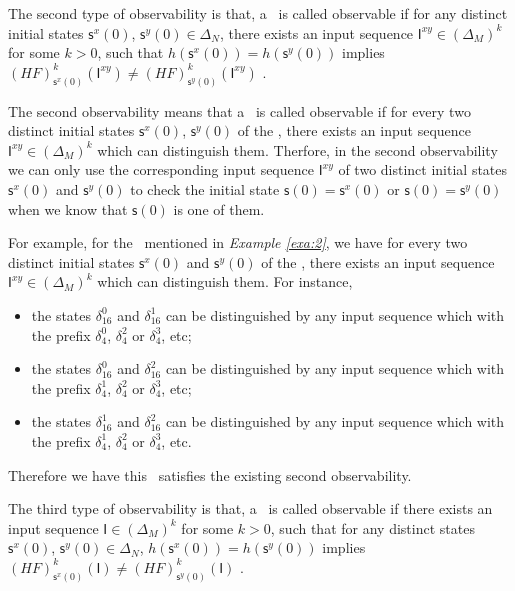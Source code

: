 \begin{definition}
	The second type of observability is that, a \BCN\ is called observable if for any distinct initial states $\mathsf{s}^{x}(0)$, $\mathsf{s}^{y}(0) \in \Delta_N$, there exists an input sequence $\mathsf{I}^{xy}\in(\Delta_M)^k$ for some $k>0$, such that $h(\mathsf{s}^{x}(0))=h(\mathsf{s}^{y}(0))$ implies $(HF)^k_{\mathsf{s}^{x}(0)}(\mathsf{I}^{xy})\neq (HF)^k_{\mathsf{s}^{y}(0)}(\mathsf{I}^{xy})$ \cite{Zhao2010Input}.
\end{definition}

The second observability means that a \BCN\ is called observable if for every two distinct initial states $\mathsf{s}^{x}(0)$, $\mathsf{s}^{y}(0)$ of the \BCN, there exists an input sequence $\mathsf{I}^{xy} \in(\Delta_M)^k$ which can distinguish them. Therfore, in the second observability we can only use the corresponding input sequence $\mathsf{I}^{xy}$ of two distinct initial states $\mathsf{s}^{x}(0)$ and $\mathsf{s}^{y}(0)$ to check the initial state $\mathsf{s}(0)=\mathsf{s}^{x}(0)$ or $\mathsf{s}(0)=\mathsf{s}^{y}(0)$ when we know that $\mathsf{s}(0)$ is one of them. 
\begin{example}
For example, for the \BCN\ mentioned in {\em Example \ref{exa:2}}, we have for every two distinct initial states $\mathsf{s}^{x}(0)$ and $\mathsf{s}^{y}(0)$ of the \BCN, there exists an input sequence $\mathsf{I}^{xy}\in(\Delta_M)^k$ which can distinguish them.  For instance,
\begin{itemize}
  \item the states $\delta_{16}^0$ and $\delta_{16}^1$ can be distinguished by any input sequence which with the prefix $\delta_{4}^0$, $\delta_{4}^2 $ or $\delta_{4}^3$, etc;
  \item the states $\delta_{16}^0$ and $\delta_{16}^2$  can be distinguished by any input sequence which with the prefix $\delta_{4}^1$, $\delta_{4}^2$ or $\delta_{4}^3$, etc;
  \item the states $\delta_{16}^1$ and $\delta_{16}^2$  can be distinguished by any input sequence which with the prefix $\delta_{4}^1$, $\delta_{4}^2$ or $\delta_{4}^3$, etc.
\end{itemize} 

Therefore we have this \BCN\ satisfies the existing second observability.
\label{exa:5}
\end{example}   
\begin{definition}
The third type of observability is that, a \BCN\ is called observable if there exists an input sequence $\mathsf{I}\in(\Delta_M)^k$ for some $k>0$, such that for any distinct states $\mathsf{s}^{x}(0)$, $\mathsf{s}^{y}(0) \in \Delta_N$, $h(\mathsf{s}^{x}(0))=h(\mathsf{s}^{y}(0))$ implies $(HF)^k_{\mathsf{s}^{x}(0)}(\mathsf{I})\neq (HF)^k_{\mathsf{s}^{y}(0)}(\mathsf{I})$ \cite{Cheng2011Identification}.
\end{definition}

